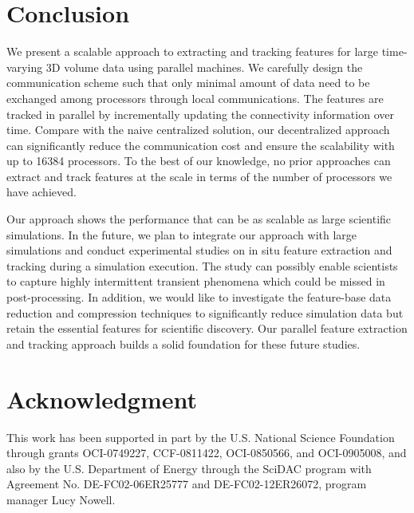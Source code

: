 \section{Conclusion}

We present a scalable approach to extracting and tracking features for large time-varying 3D volume data using parallel machines. We carefully design the communication scheme such that only minimal amount of data need to be exchanged among processors through local communications. The features are tracked in parallel by incrementally updating the connectivity information over time. Compare with the naive centralized solution, our decentralized approach can significantly reduce the communication cost and ensure the scalability with up to 16384 processors. To the best of our knowledge, no prior approaches can extract and track features at the scale in terms of the number of processors we have achieved. 

Our approach shows the performance that can be as scalable as large scientific simulations. In the future, we plan to integrate our approach with large simulations and conduct experimental studies on in situ feature extraction and tracking during a simulation execution. The study can possibly enable scientists to capture highly intermittent transient phenomena which could be missed in post-processing. In addition, we would like to investigate the feature-base data reduction and compression techniques to significantly reduce simulation data but retain the essential features for scientific discovery. Our parallel feature extraction and tracking approach builds a solid foundation for these future studies.

\section{Acknowledgment}

This work has been supported in part by the U.S. National Science Foundation through grants OCI-0749227, CCF-0811422, OCI-0850566, and OCI-0905008, and also by the U.S. Department of Energy through the SciDAC program with Agreement No. DE-FC02-06ER25777 and DE-FC02-12ER26072, program manager Lucy Nowell.